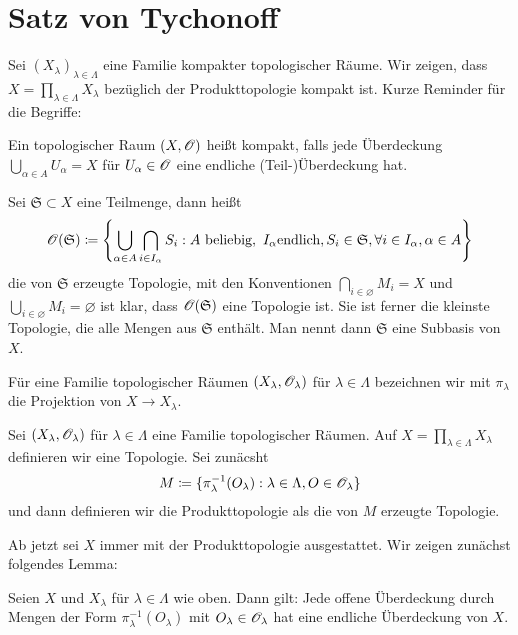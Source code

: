 \section*{Satz von Tychonoff} 
Sei $(X_\lambda)_{\lambda\in \Lambda}$ eine Familie kompakter topologischer Räume. Wir zeigen, dass $X=\prod_{\lambda\in\Lambda} X_\lambda$ bezüglich der Produkttopologie kompakt ist.
Kurze Reminder für die Begriffe:
\begin{defn}
    Ein topologischer Raum $(X,\mathscr{O})$ heißt kompakt, falls jede Überdeckung $\bigcup_{\alpha\in A} U_\alpha = X$ für $U_\alpha\in \mathscr{O}$ eine endliche (Teil-)Überdeckung hat.
\end{defn} 
\begin{defn}
    Sei $\mathfrak{S}\subset X$ eine Teilmenge, dann heißt 
    \[
        \cali{O}(\mathfrak{S})\coloneqq \left\{ \bigcup_{\alpha\in A}\bigcap_{i\in I_\alpha} S_i: A \text{ beliebig},\ I_\alpha \text{endlich}, S_i\in \mathfrak{S}, \forall i\in I_\alpha,\alpha\in A\right\}    
    \]
    die von $\mathfrak{S}$ erzeugte Topologie, mit den Konventionen $\bigcap_{i\in \varnothing} M_i = X$ und $\bigcup_{i\in \varnothing} M_i = \varnothing$ ist klar, dass $\mathscr{O}(\mathfrak{S})$ eine Topologie ist. Sie ist ferner die kleinste Topologie, die alle Mengen aus $\mathfrak{S}$ enthält. Man nennt dann $\mathfrak{S}$ eine Subbasis von $X$.
\end{defn}
Für eine Familie topologischer Räumen $(X_\lambda,\mathscr{O}_\lambda)$ für $\lambda\in \Lambda$ bezeichnen wir mit $\pi_\lambda$ die Projektion von $X\to X_\lambda$. 
\begin{defn}[Produkttopologie] Sei $(X_\lambda,\mathscr{O}_\lambda)$ für $\lambda\in \Lambda$ eine Familie topologischer Räumen. Auf $X=\prod_{\lambda\in\Lambda} X_\lambda$ definieren wir eine Topologie. Sei zunäcsht 
    \[
        M\coloneqq \{\pi_\lambda^{-1}(O_\lambda) : \lambda\in \Lambda, O\in \mathscr{O}_\lambda\}
    \] 
    und dann definieren wir 
    die Produkttopologie als die von $M$ erzeugte Topologie.
    \end{defn}
Ab jetzt sei $X$ immer mit der Produkttopologie ausgestattet. Wir zeigen zunächst folgendes Lemma:
\begin{lemma} Seien $X$ und $X_\lambda$ für $\lambda\in \Lambda$ wie oben. Dann gilt: Jede offene Überdeckung durch Mengen der Form
    $\pi_\lambda^{-1}(O_\lambda)$ mit $O_\lambda\in \mathscr{O}_\lambda$ hat eine endliche Überdeckung von $X$.
\end{lemma}
